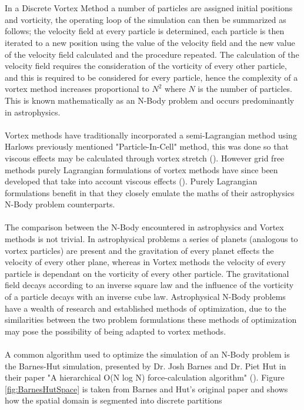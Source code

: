 \\\\
In a Discrete Vortex Method a number of particles are assigned initial positions and vorticity, the operating loop of the simulation can then be summarized as follows; the velocity field at every particle is determined, each particle is then iterated to a new position using the value of the velocity field and the new value of the velocity field calculated and the procedure repeated. The calculation of the velocity field requires the consideration of the vorticity of every other particle, and this is required to be considered for every particle, hence the complexity of a vortex method increases proportional to $N^2$ where $N$ is the number of particles. This is known mathematically as an N-Body problem and occurs predominantly in astrophysics.
\\\\
Vortex methods have traditionally incorporated a semi-Lagrangian method using Harlows previously mentioned "Particle-In-Cell" method, this was done so that viscous effects may be calculated through vortex stretch (\cite{liu_2001}). However grid free methods purely Lagrangian formulations of vortex methods have since been developed that take into account viscous effects (\cite{barba_1996}). Purely Lagrangian formulations benefit in that they closely emulate the maths of their astrophysics N-Body problem counterparts.
\\\\
The comparison between the N-Body encountered in astrophysics and Vortex methods is not trivial. In astrophysical problems a series of planets (analogous to vortex particles) are present and the gravitation of every planet effects the velocity of every other plane, whereas in Vortex methods the velocity of every particle is dependant on the vorticity of every other particle. The gravitational field decays according to an inverse square law and the influence of the vorticity of a particle decays with an inverse cube law.  Astrophysical N-Body problems have a wealth of research and established methods of optimization, due to the similarities between the two problem formulations these methods of optimization may pose the possibility of being adapted to vortex methods.
\\\\
A common algorithm used to optimize the simulation of an N-Body problem is the Barnes-Hut simulation, presented by Dr. Josh Barnes and Dr. Piet Hut in their paper "A hierarchical O(N log N) force-calculation algorithm" (\cite{barnes_hut_1986}). Figure \ref{fig:BarnesHutSpace} is taken from Barnes and Hut's original paper and shows how the spatial domain is segmented into discrete partitions

